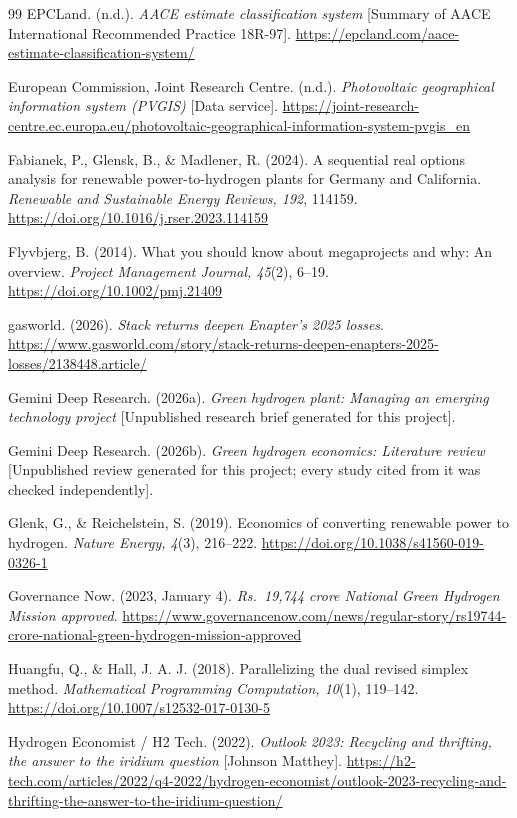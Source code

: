 {\begin{thebibliography}{99}
 EPCLand. (n.d.). \emph{AACE estimate classification system} [Summary of AACE International Recommended Practice 18R-97]. \url{https://epcland.com/aace-estimate-classification-system/}

 European Commission, Joint Research Centre. (n.d.). \emph{Photovoltaic geographical information system (PVGIS)} [Data service]. \url{https://joint-research-centre.ec.europa.eu/photovoltaic-geographical-information-system-pvgis_en}

 Fabianek, P., Glensk, B., \& Madlener, R. (2024). A sequential real options analysis for renewable power-to-hydrogen plants for Germany and California. \emph{Renewable and Sustainable Energy Reviews, 192}, 114159. \url{https://doi.org/10.1016/j.rser.2023.114159}

 Flyvbjerg, B. (2014). What you should know about megaprojects and why: An overview. \emph{Project Management Journal, 45}(2), 6--19. \url{https://doi.org/10.1002/pmj.21409}

 gasworld. (2026). \emph{Stack returns deepen Enapter's 2025 losses}. \url{https://www.gasworld.com/story/stack-returns-deepen-enapters-2025-losses/2138448.article/}

 Gemini Deep Research. (2026a). \emph{Green hydrogen plant: Managing an emerging technology project} [Unpublished research brief generated for this project].

 Gemini Deep Research. (2026b). \emph{Green hydrogen economics: Literature review} [Unpublished review generated for this project; every study cited from it was checked independently].

 Glenk, G., \& Reichelstein, S. (2019). Economics of converting renewable power to hydrogen. \emph{Nature Energy, 4}(3), 216--222. \url{https://doi.org/10.1038/s41560-019-0326-1}

 Governance Now. (2023, January 4). \emph{Rs.\ 19,744 crore National Green Hydrogen Mission approved}. \url{https://www.governancenow.com/news/regular-story/rs19744-crore-national-green-hydrogen-mission-approved}

 Huangfu, Q., \& Hall, J. A. J. (2018). Parallelizing the dual revised simplex method. \emph{Mathematical Programming Computation, 10}(1), 119--142. \url{https://doi.org/10.1007/s12532-017-0130-5}

 Hydrogen Economist / H2 Tech. (2022). \emph{Outlook 2023: Recycling and thrifting, the answer to the iridium question} [Johnson Matthey]. \url{https://h2-tech.com/articles/2022/q4-2022/hydrogen-economist/outlook-2023-recycling-and-thrifting-the-answer-to-the-iridium-question/}


\end{thebibliography}}
